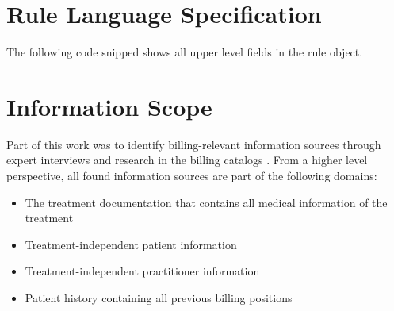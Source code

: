 \section{Rule Language Specification}\label{sec:rule-language-specification}

The following code snipped \addref shows all upper level fields in the rule object.



\section{Information Scope}\label{sec:information-scope}
Part of this work was
to identify billing-relevant information sources through expert interviews and research in the billing catalogs \addcite.
From a higher level perspective, all found information sources are part of the following domains:
\begin{itemize}
    \item The treatment documentation that contains all medical information of the treatment
    \item Treatment-independent patient information
    \item Treatment-independent practitioner information
    \item Patient history containing all previous billing positions
\end{itemize}







